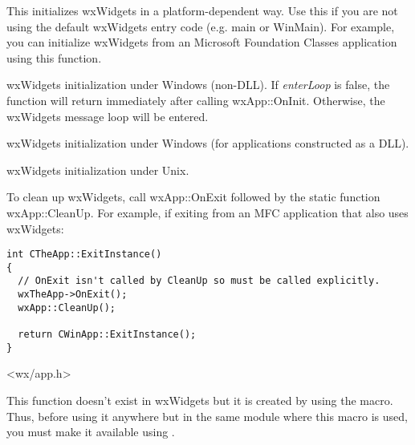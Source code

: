 \label{wxentry}

This initializes wxWidgets in a platform-dependent way. Use this if you
are not using the default wxWidgets entry code (e.g. main or WinMain). For example,
you can initialize wxWidgets from an Microsoft Foundation Classes application using
this function.


wxWidgets initialization under Windows (non-DLL). If {\it enterLoop} is false, the
function will return immediately after calling wxApp::OnInit. Otherwise, the wxWidgets
message loop will be entered.


wxWidgets initialization under Windows (for applications constructed as a DLL).


wxWidgets initialization under Unix.


To clean up wxWidgets, call wxApp::OnExit followed by the static function
wxApp::CleanUp. For example, if exiting from an MFC application that also uses wxWidgets:

\begin{verbatim}
int CTheApp::ExitInstance()
{
  // OnExit isn't called by CleanUp so must be called explicitly.
  wxTheApp->OnExit();
  wxApp::CleanUp();

  return CWinApp::ExitInstance();
}
\end{verbatim}


<wx/app.h>



\label{wxgetapp}


This function doesn't exist in wxWidgets but it is created by using
the  macro. Thus, before using it
anywhere but in the same module where this macro is used, you must make it
available using .

